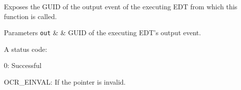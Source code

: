 Exposes the GUID of the output event of the executing EDT from which this function is called.

\begin{DoxyParams}[1]{Parameters}
\mbox{\tt out}  &  & GUID of the executing EDT's output event.\\
\hline
\end{DoxyParams}

\returns
A status code:
\begin{DoxyItemize}
\item 0: Successful
\item OCR\_EINVAL: If the pointer is invalid.
\end{DoxyItemize}

